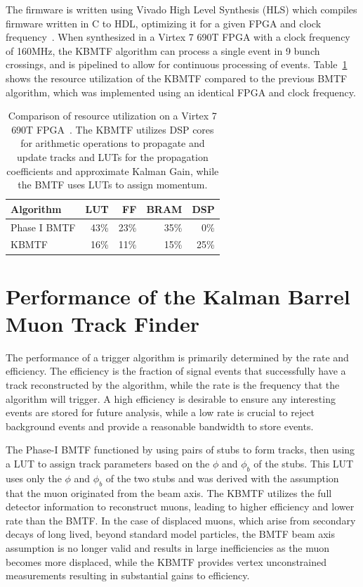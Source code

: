 The firmware is written using Vivado High Level Synthesis (HLS) which compiles firmware written in C to HDL, optimizing it for a given FPGA and clock frequency~\cite{Bachtis:2648953}. When synthesized in a Virtex 7 690T FPGA with a clock frequency of 160\unit{MHz}, the KBMTF algorithm can process a single event in 9 bunch crossings, and is pipelined to allow for continuous processing of events. Table~\ref{tab:kmtfFW} shows the resource utilization of the KBMTF compared to the previous BMTF algorithm, which was implemented using an identical FPGA and clock frequency.

\begin{table} [htb!]
	\centering
	\begin{tabular}{|l|r r r r|}
	\hline
	Algorithm & LUT & FF & BRAM & DSP \\
	\hline
	Phase I BMTF & 43\% & 23\% & 35\% & 0\%\\
	KBMTF & 16\% & 11\% & 15\% & 25\% \\
	\hline 
	\end{tabular}
	\caption[Comparison of resource utilization on a Virtex 7 690T FPGA. The KBMTF utilizes DSP cores for arithmetic operations to propagate and update tracks and LUTs for the propagation coefficients and approximate Kalman Gain, while the BMTF uses LUTs to assign momentum.]
	{Comparison of resource utilization on a Virtex 7 690T FPGA~\cite{CERN-LHCC-2020-004}. The KBMTF utilizes DSP cores for arithmetic operations to propagate and update tracks and LUTs for the propagation coefficients and approximate Kalman Gain, while the BMTF uses LUTs to assign momentum.}
	\label{tab:kmtfFW}
\end{table}

\section{Performance of the Kalman Barrel Muon Track Finder} \label{sec:kmtf_performance}
The performance of a trigger algorithm is primarily determined by the rate and efficiency. The efficiency is the fraction of signal events that successfully have a track reconstructed by the algorithm, while the rate is the frequency that the algorithm will trigger. A high efficiency is desirable to ensure any interesting events are stored for future analysis, while a low rate is crucial to reject background events and provide a reasonable bandwidth to store events.

The Phase-I BMTF functioned by using pairs of stubs to form tracks, then using a LUT to assign track parameters based on the $\phi$ and $\phi_b$ of the stubs. This LUT uses only the $\phi$ and $\phi_b$ of the two stubs and was derived with the assumption that the muon originated from the beam axis. The KBMTF utilizes the full detector information to reconstruct muons, leading to higher efficiency and lower rate than the BMTF. In the case of displaced muons, which arise from secondary decays of long lived, beyond standard model particles, the BMTF beam axis assumption is no longer valid and results in large inefficiencies as the muon becomes more displaced, while the KBMTF provides vertex unconstrained measurements resulting in substantial gains to efficiency.

